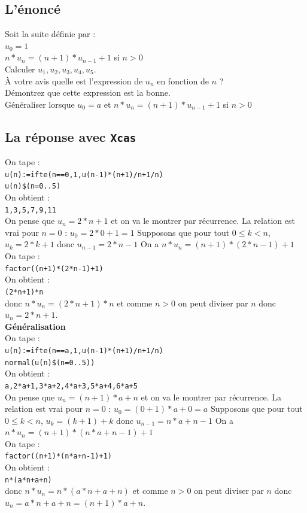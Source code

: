 \documentclass[a4paper,11pt]{book}
\begin{document}
\subsection{L'\'enonc\'e}
Soit la suite d\'efinie par :\\
$u_0=1$\\
$n*u_{n}=(n+1)*u_{n-1}+1$ si $n>0$\\
Calculer $u_1,u_2,u_3,u_4,u_5$.\\
\`A votre avis quelle est l'expression de $u_n$ en fonction de $n$ ?\\
D\'emontrez que cette expression est la bonne.\\
G\'en\'eraliser lorsque $u_0=a$ et $n*u_{n}=(n+1)*u_{n-1}+1$ si $n>0$\\

\subsection{La r\'eponse avec {\tt Xcas}}
On tape :\\
{\tt u(n):=ifte(n==0,1,u(n-1)*(n+1)/n+1/n)}\\
{\tt u(n)\$(n=0..5)}\\
On obtient :\\
{\tt 1,3,5,7,9,11}\\
On pense que $u_n=2*n+1$ et on va le montrer par r\'ecurrence.
La relation est vrai pour $n=0$ : $u_0=2*0+1=1$
Supposons que pour tout $0\leq k<n$, $u_k=2*k+1$ donc $u_{n-1}=2*n-1$
On a $n*u_n=(n+1)*(2*n-1)+1$\\
On tape :\\
{\tt factor((n+1)*(2*n-1)+1)}\\
On obtient :\\
{\tt (2*n+1)*n}\\
donc $n*u_n=(2*n+1)*n$ et comme $n>0$ on peut diviser par $n$ donc
$u_n=2*n+1$.\\
{\bf G\'en\'eralisation}\\
On tape :\\
{\tt u(n):=ifte(n==a,1,u(n-1)*(n+1)/n+1/n)}\\
{\tt normal(u(n)\$(n=0..5))}\\
On obtient :\\
{\tt a,2*a+1,3*a+2,4*a+3,5*a+4,6*a+5}\\
On pense que $u_n=(n+1)*a+n$ et on va le montrer par r\'ecurrence.
La relation est vrai pour $n=0$ : $u_0=(0+1)*a+0=a$
Supposons que pour tout $0\leq k<n$, $u_k=(k+1)+k$ donc $u_{n-1}=n*a+n-1$
On a $n*u_n=(n+1)*(n*a+n-1)+1$\\
On tape :\\
{\tt factor((n+1)*(n*a+n-1)+1)}\\
On obtient :\\
{\tt n*(a*n+a+n)}\\
donc $n*u_n=n*(a*n+a+n)$ et comme $n>0$ on peut diviser par $n$ donc
$u_n=a*n+a+n=(n+1)*a+n$.
\end{document}
